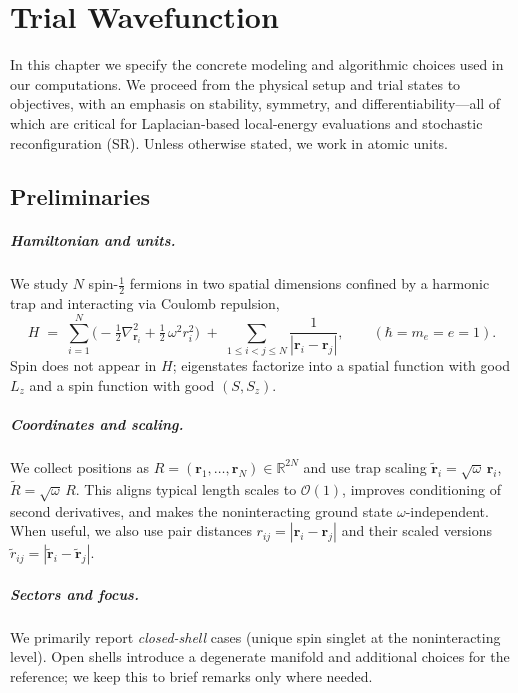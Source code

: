 \chapter{Trial Wavefunction}
\label{ch:trial_wavefunction}

In this chapter we specify the concrete modeling and algorithmic choices used in our computations.
We proceed from the physical setup and trial states to objectives, with an emphasis on stability,
symmetry, and differentiability---all of which are critical for Laplacian-based local-energy
evaluations and stochastic reconfiguration (SR). Unless otherwise stated, we work in atomic units.

\section{Preliminaries}
\label{sec:setup}

\paragraph{Hamiltonian and units.}
We study $N$ spin-$\tfrac12$ fermions in two spatial dimensions confined by a harmonic trap
and interacting via Coulomb repulsion,
\begin{equation}
\label{eq:dot-h}
H \;=\; \sum_{i=1}^N \Big( -\tfrac12 \nabla_{\mathbf r_i}^2 + \tfrac12 \,\omega^2 r_i^2 \Big)
\;+\; \sum_{1\le i<j\le N} \frac{1}{|\mathbf r_i-\mathbf r_j|},
\qquad (\hbar=m_e=e=1).
\end{equation}
Spin does not appear in $H$; eigenstates factorize into a spatial function with good $L_z$ and a
spin function with good $(S,S_z)$.

\paragraph{Coordinates and scaling.}
We collect positions as $R=(\mathbf r_1,\ldots,\mathbf r_N)\in\mathbb R^{2N}$ and use trap scaling
$\tilde{\mathbf r}_i=\sqrt{\omega}\,\mathbf r_i$, $\tilde{R}=\sqrt{\omega}\,R$. This aligns typical
length scales to $\mathcal O(1)$, improves conditioning of second derivatives, and makes the
noninteracting ground state $\omega$-independent. When useful, we also use pair distances
$r_{ij}=|\mathbf r_i-\mathbf r_j|$ and their scaled versions $\tilde r_{ij}=|\tilde{\mathbf r}_i-\tilde{\mathbf r}_j|$.

\paragraph{Sectors and focus.}
We primarily report \emph{closed-shell} cases (unique spin singlet at the noninteracting level).
Open shells introduce a degenerate manifold and additional choices for the reference; we keep this
to brief remarks only where needed.

